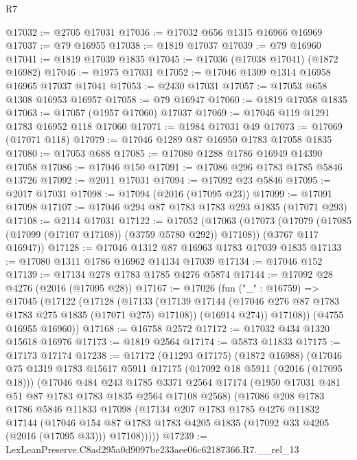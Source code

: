 \begin{lexlean}{R7}
\begin{coremodule}
@17032 := @2705 @17031
@17036 := @17032 @656 @1315 @16966 @16969
@17037 := @79 @16955
@17038 := @1819 @17037
@17039 := @79 @16960
@17041 := @1819 @17039 @1835
@17045 := @17036 (@17038 @17041) (@1872 @16982)
@17046 := @1975 @17031
@17052 := @17046 @1309 @1314 @16958 @16965 @17037 @17041
@17053 := @2430 @17031
@17057 := @17053 @658 @1308 @16953 @16957
@17058 := @79 @16947
@17060 := @1819 @17058 @1835
@17063 := @17057 (@1957 @17060) @17037
@17069 := @17046 @119 @1291 @1783 @16952 @118 @17060
@17071 := @1984 @17031 @49
@17073 := @17069 (@17071 @118)
@17079 := @17046 @1289 @87 @16950 @1783 @17058 @1835
@17080 := @17053 @688
@17085 := @17080 @1288 @1786 @16949 @14390 @17058
@17086 := @17046 @150
@17091 := @17086 @296 @1783 @1785 @5846 @13726
@17092 := @2011 @17031
@17094 := @17092 @23 @5846
@17095 := @2017 @17031
@17098 := @17094 (@2016 (@17095 @23))
@17099 := @17091 @17098
@17107 := @17046 @294 @87 @1783 @1783 @293 @1835 (@17071 @293)
@17108 := @2114 @17031
@17122 := @17052
    (@17063
      (@17073 (@17079 (@17085 (@17099 (@17107 @17108)) (@3759 @5780 @292)) @17108))
      (@3767 @117 @16947))
@17128 := @17046 @1312 @87 @16963 @1783 @17039 @1835
@17133 := @17080 @1311 @1786 @16962 @14134 @17039
@17134 := @17046 @152
@17139 := @17134 @278 @1783 @1785 @4276 @5874
@17144 := @17092 @28 @4276 (@2016 (@17095 @28))
@17167 := @17026
    (fun ("_" : @16759) =>
    @17045
      (@17122
        (@17128
          (@17133
            (@17139 @17144 (@17046 @276 @87 @1783 @1783 @275 @1835 (@17071 @275) @17108))
            (@16914 @274))
          @17108))
      (@4755 @16955 @16960))
@17168 := @16758 @2572
@17172 := @17032 @434 @1320 @15618 @16976
@17173 := @1819 @2564
@17174 := @5873 @11833
@17175 := @17173 @17174
@17238 := @17172
    (@11293 @17175)
    (@1872 @16988)
    (@17046
      @75
      @1319
      @1783
      @15617
      @5911
      @17175
      (@17092 @18 @5911 (@2016 (@17095 @18)))
      (@17046
        @484
        @243
        @1785
        @3371
        @2564
        @17174
        (@1950 @17031 @481 @51 @87 @1783 @1783 @1835 @2564 @17108 @2568)
        (@17086
          @208
          @1783
          @1786
          @5846
          @11833
          @17098
          (@17134
            @207
            @1783
            @1785
            @4276
            @11832
            @17144
            (@17046
              @154
              @87
              @1783
              @1783
              @4205
              @1835
              (@17092 @33 @4205 (@2016 (@17095 @33)))
              @17108)))))
@17239 := LexLeanPreserve.C8ad295a0d9097be233aee06c62187366.R7.__rel_13

\end{coremodule}
\end{lexlean}

